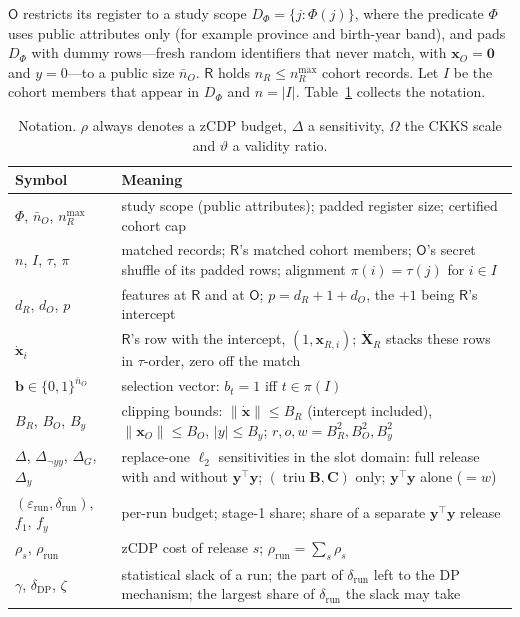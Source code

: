 \documentclass[11pt]{article}
\theoremstyle{definition}
\theoremstyle{plain}
\newcommand{\by}{\mathbf{y}}
\newcommand{\bx}{\mathbf{x}}
\newcommand{\bxd}{\dot{\mathbf{x}}}
\newcommand{\bb}{\mathbf{b}}
\newcommand{\bB}{\mathbf{B}}
\newcommand{\bC}{\mathbf{C}}
\newcommand{\dXR}{\dot{\mathbf{X}}_{R}}
\newcommand{\Party}[1]{\textsf{#1}}
\newcommand{\Rp}{\Party{R}}
\newcommand{\Op}{\Party{O}}
\DeclareMathOperator{\triu}{triu}
\begin{document}
$\Op$ restricts its register to a study scope $D_\Phi = \{j : \Phi(j)\}$, where the predicate $\Phi$ uses public attributes only (for example province and birth-year band), and pads $D_\Phi$ with dummy rows---fresh random identifiers that never match, with $\bx_O = \mathbf 0$ and $y = 0$---to a public size $\bar n_O$. $\Rp$ holds $n_R \le n_R^{\max}$ cohort records. Let $I$ be the cohort members that appear in $D_\Phi$ and $n = |I|$. Table~\ref{tab:notation} collects the notation.

\begin{table}[ht]
\centering\small
\caption{Notation. $\rho$ always denotes a zCDP budget, $\Delta$ a sensitivity, $\Omega$ the CKKS scale and $\vartheta$ a validity ratio.}
\label{tab:notation}
\renewcommand{\arraystretch}{1.2}
\begin{tabularx}{\textwidth}{@{}l>{\raggedright\arraybackslash}X@{}}
\toprule
\textbf{Symbol} & \textbf{Meaning} \\
\midrule
$\Phi$, $\bar n_O$, $n_R^{\max}$ & study scope (public attributes); padded register size; certified cohort cap \\
$n$, $I$, $\tau$, $\pi$ & matched records; $\Rp$'s matched cohort members; $\Op$'s secret shuffle of its padded rows; alignment $\pi(i) = \tau(j)$ for $i \in I$ \\
$d_R$, $d_O$, $p$ & features at $\Rp$ and at $\Op$; $p = d_R + 1 + d_O$, the $+1$ being $\Rp$'s intercept \\
$\bxd_i$ & $\Rp$'s row with the intercept, $(1, \bx_{R,i})$; $\dXR$ stacks these rows in $\tau$-order, zero off the match \\
$\bb \in \{0,1\}^{\bar n_O}$ & selection vector: $b_t = 1$ iff $t \in \pi(I)$ \\
$B_R$, $B_O$, $B_y$ & clipping bounds: $\|\bxd\| \le B_R$ (intercept included), $\|\bx_O\| \le B_O$, $|y| \le B_y$; $r, o, w = B_R^2, B_O^2, B_y^2$ \\
$\Delta$, $\Delta_{\neg yy}$, $\Delta_G$, $\Delta_y$ & replace-one $\ell_2$ sensitivities in the slot domain: full release with and without $\by^\top\by$; $(\triu\bB, \bC)$ only; $\by^\top\by$ alone ($= w$) \\
$(\varepsilon_{\mathrm{run}}, \delta_{\mathrm{run}})$, $f_1$, $f_y$ & per-run budget; stage-1 share; share of a separate $\by^\top\by$ release \\
$\rho_s$, $\rho_{\mathrm{run}}$ & zCDP cost of release $s$; $\rho_{\mathrm{run}} = \sum_s \rho_s$ \\
$\gamma$, $\delta_{\mathrm{DP}}$, $\zeta$ & statistical slack of a run; the part of $\delta_{\mathrm{run}}$ left to the DP mechanism; the largest share of $\delta_{\mathrm{run}}$ the slack may take \\

\end{tabularx}
\end{table}
\end{document}
